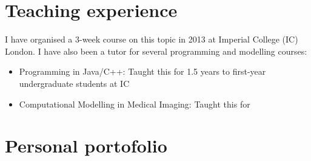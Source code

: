 \documentclass[11pt,a4paper]{article}
\begin{document}
\section{Teaching experience}

I have organised a 3-week course on this topic in 2013 at Imperial College (IC) London. I have also been a tutor for several programming and modelling courses:
\begin{itemize}
 \item Programming in Java/C++: Taught this for 1.5 years to first-year undergraduate students at IC
 \item Computational Modelling in Medical Imaging: Taught this for 
\end{itemize}


\section*{Personal portofolio}
\end{document}
